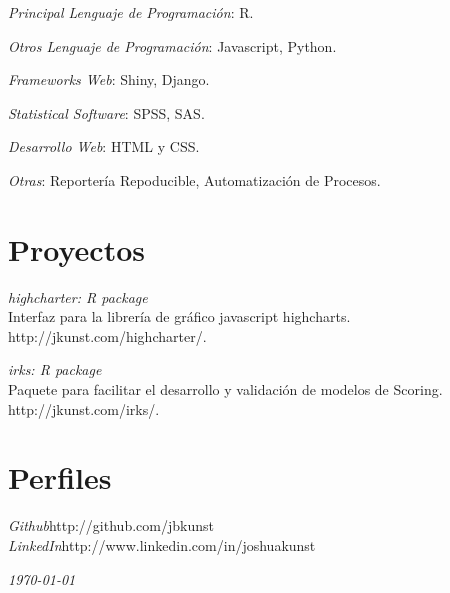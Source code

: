 \documentclass[margin]{res}
\begin{document}
\begin{resume}
    {\sl Principal Lenguaje de Programación}: R.
    
    {\sl Otros Lenguaje de Programación}: Javascript, Python.

    {\sl Frameworks Web}: Shiny, Django.

    {\sl Statistical Software}: SPSS, SAS.
    
    {\sl Desarrollo Web}: HTML y CSS.
    
    {\sl Otras}: Reportería Repoducible, Automatización de Procesos.

\vspace{1cm}

\section{Proyectos}


    {\sl highcharter: R package}\\
    Interfaz para la librería de gráfico javascript highcharts.\\
    http://jkunst.com/highcharter/.
    
    {\sl irks: R package}\\
    Paquete para facilitar el desarrollo y validación de modelos
    de Scoring.\\
    http://jkunst.com/irks/.

\vspace{1cm}

\section{Perfiles}
    
    {\sl Github}\hfill http://github.com/jbkunst\\
    
    {\sl LinkedIn}\hfill http://www.linkedin.com/in/joshuakunst

\vspace{1cm}


\end{resume}

\vspace{0.5cm}

\hfill {\sl \today}
\end{document}
